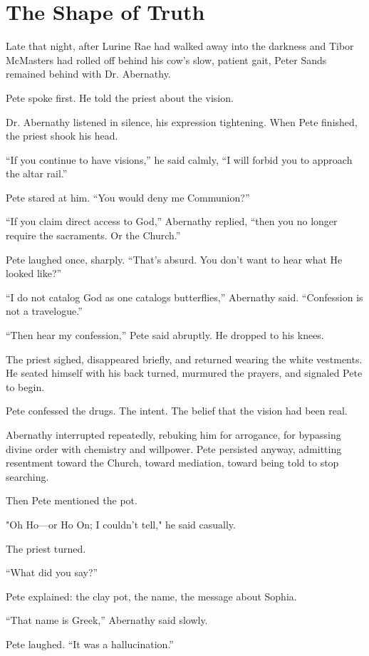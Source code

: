 \chapter{The Shape of Truth}

Late that night, after Lurine Rae had walked away into the darkness and Tibor McMasters had rolled off behind his cow’s slow, patient gait, Peter Sands remained behind with Dr. Abernathy.

Pete spoke first. He told the priest about the vision.

Dr. Abernathy listened in silence, his expression tightening. When Pete finished, the priest shook his head.

“If you continue to have visions,” he said calmly, “I will forbid you to approach the altar rail.”

Pete stared at him. “You would deny me Communion?”

“If you claim direct access to God,” Abernathy replied, “then you no longer require the sacraments. Or the Church.”

Pete laughed once, sharply. “That’s absurd. You don’t want to hear what He looked like?”

“I do not catalog God as one catalogs butterflies,” Abernathy said. “Confession is not a travelogue.”

“Then hear my confession,” Pete said abruptly. He dropped to his knees.

The priest sighed, disappeared briefly, and returned wearing the white vestments. He seated himself with his back turned, murmured the prayers, and signaled Pete to begin.

Pete confessed the drugs. The intent. The belief that the vision had been real.

Abernathy interrupted repeatedly, rebuking him for arrogance, for bypassing divine order with chemistry and willpower. Pete persisted anyway, admitting resentment toward the Church, toward mediation, toward being told to stop searching.

Then Pete mentioned the pot.

"Oh Ho—or Ho On; I couldn’t tell," he said casually.

The priest turned.

“What did you say?”

Pete explained: the clay pot, the name, the message about Sophia.

“That name is Greek,” Abernathy said slowly.

Pete laughed. “It was a hallucination.”

